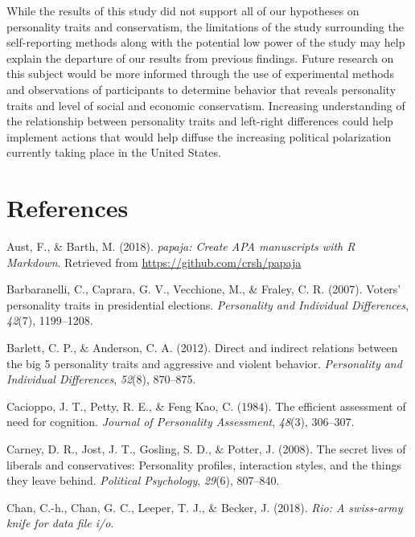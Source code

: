\documentclass[man]{apa6}
\begin{document}
While the results of this study did not support all of our hypotheses on
personality traits and conservatism, the limitations of the study
surrounding the self-reporting methods along with the potential low
power of the study may help explain the departure of our results from
previous findings. Future research on this subject would be more
informed through the use of experimental methods and observations of
participants to determine behavior that reveals personality traits and
level of social and economic conservatism. Increasing understanding of
the relationship between personality traits and left-right differences
could help implement actions that would help diffuse the increasing
political polarization currently taking place in the United States.

\newpage

\section{References}\label{references}

\begingroup
\setlength{\parindent}{-0.5in} \setlength{\leftskip}{0.5in}

\hypertarget{refs}{}
\hypertarget{ref-R-papaja}{}
Aust, F., \& Barth, M. (2018). \emph{papaja: Create APA manuscripts with
R Markdown}. Retrieved from \url{https://github.com/crsh/papaja}

\hypertarget{ref-barbaranelli2007voters}{}
Barbaranelli, C., Caprara, G. V., Vecchione, M., \& Fraley, C. R.
(2007). Voters' personality traits in presidential elections.
\emph{Personality and Individual Differences}, \emph{42}(7), 1199--1208.

\hypertarget{ref-barlett2012direct}{}
Barlett, C. P., \& Anderson, C. A. (2012). Direct and indirect relations
between the big 5 personality traits and aggressive and violent
behavior. \emph{Personality and Individual Differences}, \emph{52}(8),
870--875.

\hypertarget{ref-cacioppo1984efficient}{}
Cacioppo, J. T., Petty, R. E., \& Feng Kao, C. (1984). The efficient
assessment of need for cognition. \emph{Journal of Personality
Assessment}, \emph{48}(3), 306--307.

\hypertarget{ref-carney2008secret}{}
Carney, D. R., Jost, J. T., Gosling, S. D., \& Potter, J. (2008). The
secret lives of liberals and conservatives: Personality profiles,
interaction styles, and the things they leave behind. \emph{Political
Psychology}, \emph{29}(6), 807--840.

\hypertarget{ref-R-rio}{}
Chan, C.-h., Chan, G. C., Leeper, T. J., \& Becker, J. (2018).
\emph{Rio: A swiss-army knife for data file i/o}.
\end{document}

